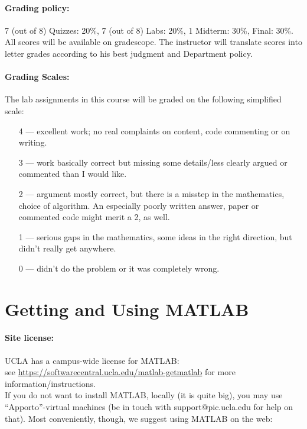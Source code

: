 \documentclass[11pt,letter]{article}
\begin{document}
\paragraph{Grading policy:} 
7 (out of 8) Quizzes: 20\%, 7 (out of 8) Labs: 20\%,  1 Midterm: 30\%, Final: 30\%.
All scores will be available on gradescope. The instructor will translate scores into letter grades according to his best judgment and Department policy.

\paragraph{Grading Scales:} The lab assignments in this course will be graded on the following simplified scale:
\begin{itemize}
\item[4 ---] excellent work; no real complaints on content, code commenting or on writing.
\item[3 ---] work basically correct but missing some details/less clearly argued or commented than I
would like.
\item[2 ---] argument mostly correct, but there is a misstep in the mathematics, choice of algorithm.
An especially poorly written answer, paper or commented code might merit a 2, as well.
\item[1 ---] serious gaps in the mathematics, some ideas in the right direction, but didn't really get
anywhere.
\item[0 ---] didn't do the problem or it was completely wrong.
\end{itemize}


\newpage
\section*{Getting and Using MATLAB}

\paragraph{Site license:}
UCLA has a campus-wide license for MATLAB:\\
 see  \url{https://softwarecentral.ucla.edu/matlab-getmatlab} for more information/instructions.\\

If you do not want to install MATLAB, locally (it is quite big), you may use ``Apporto''-virtual machines (be in touch with support@pic.ucla.edu for help on that). Most conveniently, though, we suggest using MATLAB on the web: 
\end{document}
